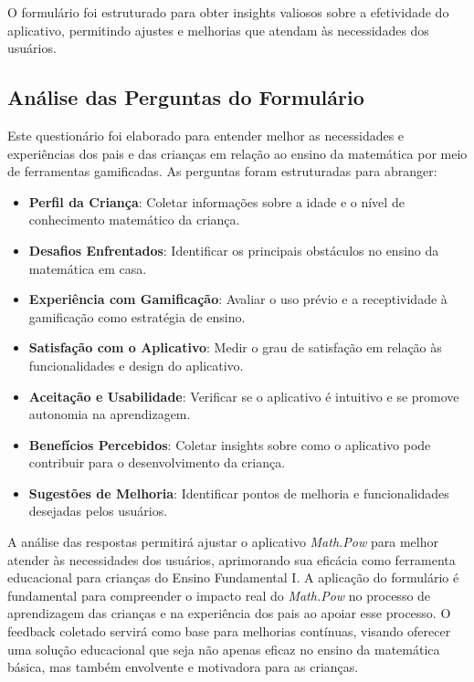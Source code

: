 O formulário foi estruturado para obter insights valiosos sobre a efetividade do aplicativo, permitindo ajustes e melhorias que atendam às necessidades dos usuários.

\subsection{Análise das Perguntas do Formulário}

Este questionário foi elaborado para entender melhor as necessidades e experiências dos pais e das crianças em relação ao ensino da matemática por meio de ferramentas gamificadas. As perguntas foram estruturadas para abranger:

\begin{itemize}
    \item \textbf{Perfil da Criança}: Coletar informações sobre a idade e o nível de conhecimento matemático da criança.
    \item \textbf{Desafios Enfrentados}: Identificar os principais obstáculos no ensino da matemática em casa.
    \item \textbf{Experiência com Gamificação}: Avaliar o uso prévio e a receptividade à gamificação como estratégia de ensino.
    \item \textbf{Satisfação com o Aplicativo}: Medir o grau de satisfação em relação às funcionalidades e design do aplicativo.
    \item \textbf{Aceitação e Usabilidade}: Verificar se o aplicativo é intuitivo e se promove autonomia na aprendizagem.
    \item \textbf{Benefícios Percebidos}: Coletar insights sobre como o aplicativo pode contribuir para o desenvolvimento da criança.
    \item \textbf{Sugestões de Melhoria}: Identificar pontos de melhoria e funcionalidades desejadas pelos usuários.
\end{itemize}

A análise das respostas permitirá ajustar o aplicativo \textit{Math.Pow} para melhor atender às necessidades dos usuários, aprimorando sua eficácia como ferramenta educacional para crianças do Ensino Fundamental I.
A aplicação do formulário é fundamental para compreender o impacto real do \textit{Math.Pow} no processo de aprendizagem das crianças e na experiência dos pais ao apoiar esse processo. O feedback coletado servirá como base para melhorias contínuas, visando oferecer uma solução educacional que seja não apenas eficaz no ensino da matemática básica, mas também envolvente e motivadora para as crianças.

